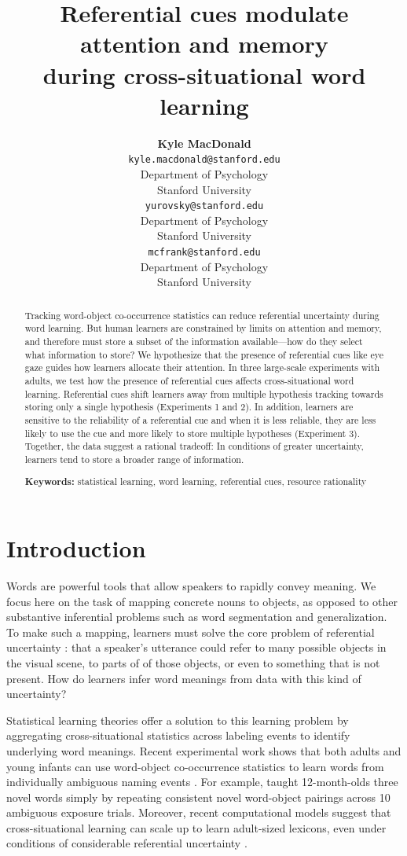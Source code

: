 \documentclass[10pt,letterpaper]{article}
\title{Referential cues modulate attention and memory \\
during cross-situational word learning}
\author{{\large \bf Kyle MacDonald} \\ \texttt{kyle.macdonald@stanford.edu} \\ Department of Psychology \\ Stanford University
  \And {\large \bf  Daniel Yurovsky} \\ \texttt{yurovsky@stanford.edu} \\ Department of Psychology \\ Stanford University
  \And {\large \bf Michael C. Frank} \\  \texttt{mcfrank@stanford.edu} \\Department of Psychology \\ Stanford University}
\begin{document}
\maketitle


\begin{abstract}
Tracking word-object co-occurrence statistics can reduce referential uncertainty during word learning. But human learners are constrained by limits on attention and memory, and therefore must store a subset of the information available---how do they select what information to store? We hypothesize that the presence of referential cues like eye gaze guides how learners allocate their attention. In three large-scale experiments with adults, we test how the presence of referential cues affects cross-situational word learning. Referential cues shift learners away from multiple hypothesis tracking towards storing only a single hypothesis (Experiments 1 and 2). In addition, learners are sensitive to the reliability of a referential cue and when it is less reliable, they are less likely to use the cue and more likely to store multiple hypotheses (Experiment 3). Together, the data suggest a rational tradeoff: In conditions of greater uncertainty, learners tend to store a broader range of information. 

\textbf{Keywords:} 
statistical learning, word learning, referential cues, resource rationality
\end{abstract}


\section{Introduction}

Words are powerful tools that allow speakers to rapidly convey meaning. We focus here on the task of mapping concrete nouns to objects, as opposed to other substantive inferential problems such as word segmentation and generalization. To make such a mapping, learners must solve the core problem of referential uncertainty \cite{quine19600}: that a speaker's utterance could refer to many possible objects in the visual scene, to parts of of those objects, or even to something that is not present. How do learners infer word meanings from data with this kind of uncertainty?

Statistical learning theories offer a solution to this learning problem by aggregating cross-situational statistics across labeling events to identify underlying word meanings. Recent experimental work shows that both adults and young infants can use word-object co-occurrence statistics to learn words from individually ambiguous naming events \cite{smith2008infants, vouloumanos2008fine}. For example,  taught 12-month-olds three novel words simply by repeating consistent novel word-object pairings across 10 ambiguous exposure trials. Moreover, recent computational models suggest that cross-situational learning can scale up to learn adult-sized lexicons, even under conditions of considerable referential uncertainty \cite{smith2011cross}.
\end{document}
